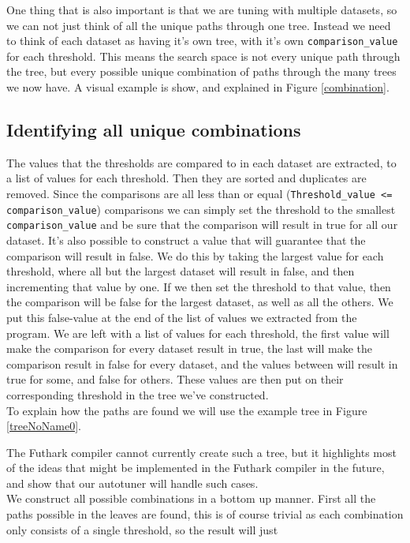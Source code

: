 One thing that is also important is that we are tuning with multiple datasets,
so we can not just think of all the unique paths through one tree. Instead we
need to think of each dataset as having it's own tree, with it's own 
\texttt{comparison\_value} for each threshold. This means the search space is
not every unique path through the tree, but every possible unique combination
of paths through the many trees we now have. A visual example is show, and explained in Figure \ref{combination}. 


\subsection{Identifying all unique combinations}
The values that the thresholds are compared to in each dataset are extracted,
to a list of values for each threshold. Then they are sorted and duplicates are
removed. Since the comparisons are all less than or equal
(\texttt{Threshold\_value <= comparison\_value}) comparisons we can simply
set the threshold to the smallest \texttt{comparison\_value} and be sure that the comparison
will result in true for all our dataset. It's also possible to construct a
value that will guarantee that the comparison will result in false. We do this
by taking the largest value for each threshold, where all but the largest
dataset will result in false, and then incrementing that value by one. If we then set the threshold to that value, then the comparison will be false for the largest dataset, as well as all the others. We put this false-value at
the end of the list of values we extracted from the program. We are left with a
list of values for each threshold, the first value will make the comparison for
every dataset result in true, the last will make the comparison result in false
for every dataset, and the values between will result in true for some, and
false for others. These values are then put on their corresponding threshold in
the tree we've constructed.
\\
To explain how the paths are found we will use the example tree in Figure \ref{treeNoName0}.

The Futhark compiler cannot currently create such a tree, but
it highlights most of the ideas that might be implemented in the Futhark
compiler in the future, and show that our autotuner will handle such cases. \\
We construct all possible combinations in a bottom up manner. First
all the paths possible in the leaves are found, this is of course trivial as
each combination only consists of a single threshold, so the result will just
